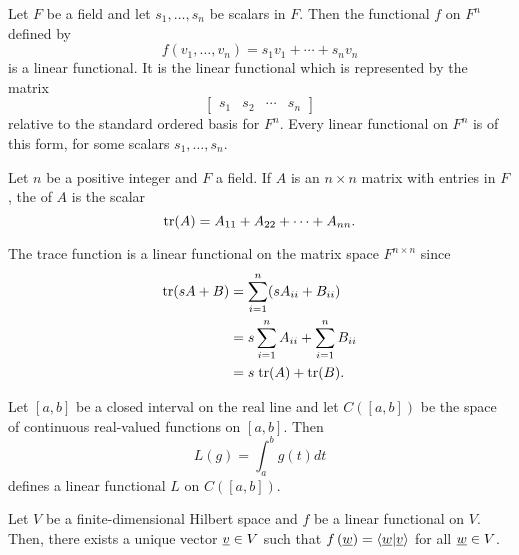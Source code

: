 \begin{example}
Let $F$ be a field and let $s_1, \ldots, s_n$ be scalars in $F$.
Then the functional $f$ on $F^n$ defined by
\begin{equation*}
f(v_1, \ldots, v_n) = s_1 v_1 + \cdots + s_n v_n
\end{equation*}
is a linear functional.
It is the linear functional which is represented by the matrix
\begin{equation*}
\begin{bmatrix} s_1 & s_2 & \cdots & s_n \end{bmatrix}
\end{equation*}
relative to the standard ordered basis for $F^n$.
Every linear functional on $F^n$ is of this form, for some scalars $s_1, \ldots, s_n$.
\end{example}

\begin{definition}
Let $n$ be a positive integer and $F$ a field.
If $A$ is an $n \times n$ matrix with entries in $F$, the  of $A$ is the scalar
\begin{equation*}
\mathrm{tr}(A) = A_{11} + A_{22} + \cdots + A_{nn}.
\end{equation*}
\end{definition}

\begin{example}
The trace function is a linear functional on the matrix space $F^{n \times n}$ since
\begin{equation*}
\begin{split}
\mathrm{tr} ( sA + B) &= \sum_{i=1}^n (s A_{ii} + B_{ii}) \\
&= s \sum_{i=1}^n A_{ii} + \sum_{i=1}^n  B_{ii} \\
&= s \; \mathrm{tr}(A) + \mathrm{tr}(B) .
\end{split}
\end{equation*}
\end{example}

\begin{example}
Let $[a, b]$ be a closed interval on the real line and let $C([a,b])$ be the space of continuous real-valued functions on $[a,b]$.
Then
\begin{equation*}
L(g) = \int_a^b g(t) dt
\end{equation*}
defines a linear functional $L$ on $C([a,b])$.
\end{example}

\begin{theorem}[Riesz] \label{theorem:riesz_finite}
Let $V$ be a finite-dimensional Hilbert space and $f$ be a linear functional on $V$.
Then, there exists a unique vector $\underline{v} \in V$ such that $f \left( \underline{w} \right) = \left\langle \underline{w} | \underline{v} \right\rangle$ for all $\underline{w} \in V$.
\end{theorem}

